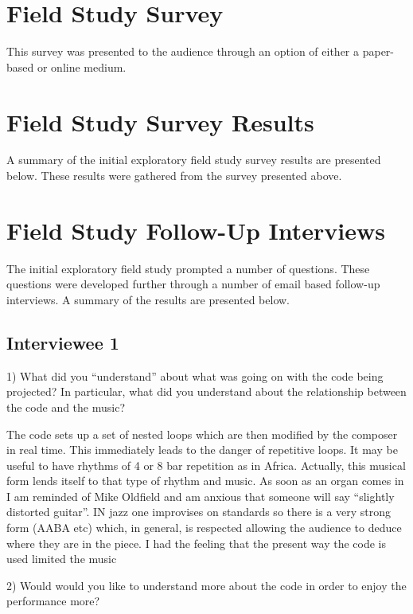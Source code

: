 
\appendix

\chapter{Field Study Survey}

This survey was presented to the audience through an option of either a paper-based or online medium.



\chapter{Field Study Survey Results}

A summary of the initial exploratory field study survey results are presented below. These results were gathered from the survey presented above.

\chapter{Field Study Follow-Up Interviews}

The initial exploratory field study prompted a number of questions. These questions were developed further through a number of email based follow-up interviews. A summary of the results are presented below.

\section*{Interviewee 1}
1) What did you ``understand'' about what was going on with the code being projected? In particular, what did you understand about the relationship between the code and the music?

The code sets up a set of nested loops which are then modified by the composer in real time. This immediately leads to the danger of repetitive loops. It may be useful to have rhythms of 4 or 8 bar repetition as in Africa. Actually, this musical form lends itself to that type of rhythm and music. As soon as an organ comes in I am reminded of Mike Oldfield and am anxious that someone will say “slightly distorted guitar”. IN jazz one improvises on standards so there is a very strong form (AABA etc) which, in general, is respected allowing the audience to deduce where they are in the piece. I had the feeling that the present way the code is used limited the music

2) Would would you like to understand more about the code in order to enjoy the performance more?


